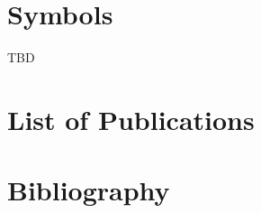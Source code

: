 \documentclass[11pt,final]{tutdrthesis}
\begin{document}
\chapter{Symbols}

%
TBD

\chapter{List of Publications}


\setcounter{secnumdepth}{2}
\mainmatter






\setcounter{secnumdepth}{-1}
\chapter{Bibliography}
%




\end{document}
